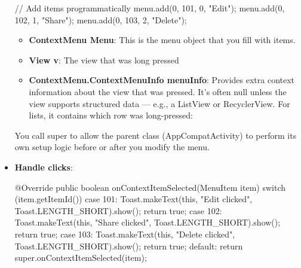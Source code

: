 \documentclass{report}
\begin{document}
\begin{itemize}
\begin{javacode}
{                    // Add items programmatically
                    menu.add(0, 101, 0, "Edit");
                    menu.add(0, 102, 1, "Share");
                    menu.add(0, 103, 2, "Delete");
                }
            \end{javacode}
            \bigbreak \noindent 
            \begin{itemize}
                \item \textbf{ContextMenu Menu}: This is the menu object that you fill with items.
                \item \textbf{View v}: The view that was long pressed
                \item \textbf{ContextMenu.ContextMenuInfo menuInfo}: Provides extra context information about the view that was pressed. It’s often null unless the view supports structured data — e.g., a ListView or RecyclerView.
                    \bigbreak \noindent 
                    For lists, it contains which row was long-pressed:
            \end{itemize}
            You call super to allow the parent class (AppCompatActivity) to perform its own setup logic before or after you modify the menu.
        \item \textbf{Handle clicks}:
            \bigbreak \noindent 
            \begin{javacode}
                @Override
                public boolean onContextItemSelected(MenuItem item) {
                    switch (item.getItemId()) {
                        case 101:
                            Toast.makeText(this, "Edit clicked", Toast.LENGTH_SHORT).show();
                            return true;
                        case 102:
                            Toast.makeText(this, "Share clicked", Toast.LENGTH_SHORT).show();
                            return true;
                        case 103:
                            Toast.makeText(this, "Delete clicked", Toast.LENGTH_SHORT).show();
                            return true;
                        default:
                            return super.onContextItemSelected(item);
                    }
                }
            \end{javacode}
    \end{itemize}

    \pagebreak 
\end{document}
